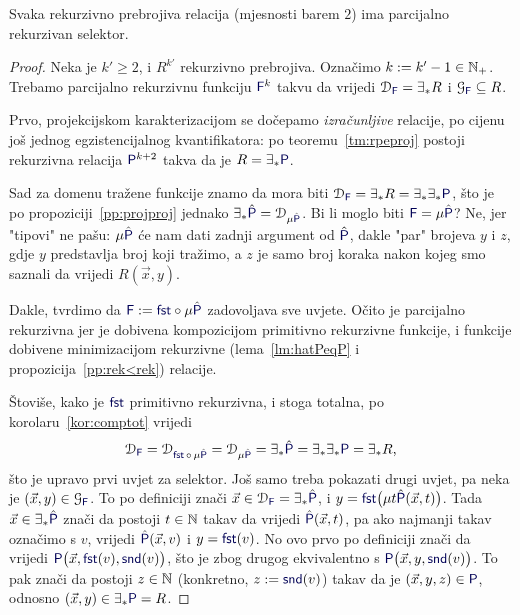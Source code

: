 \begin{lema}\label{lm:tmsel}
Svaka rekurzivno prebrojiva relacija (mjesnosti barem $2$) ima parcijalno rekurzivan selektor.
\end{lema}
\begin{proof}
Neka je $k'\ge2$, i $R^{k'}$ rekurzivno prebrojiva. Označimo $k:=k'-1\in{\mathbb N}_+$. Trebamo parcijalno rekurzivnu funkciju $\f F^k$ takvu da vrijedi $\dom{\f F}=\exists_*R$ i $\graf{\f F}\subseteq R$. 

Prvo, projekcijskom karakterizacijom se dočepamo \emph{izračunljive} relacije, po cijenu još jednog egzistencijalnog kvantifikatora: po teoremu~\ref{tm:rpeproj} postoji rekurzivna relacija $\f P^{k+2}$ takva da je $R=\exists_*\f P$.

Sad za domenu tražene funkcije znamo da mora biti $\dom{\f F}=\exists_*R=\exists_*\exists_*\f P$, što je po propoziciji~\ref{pp:projproj} jednako $\exists_*\hat{\f P}=\dom{\mu\hat{\f P}}$. Bi li moglo biti $\f F=\mu\hat{\f P}$? Ne, jer "tipovi" ne pašu: $\mu\hat{\f P}$ će nam dati zadnji argument od $\hat{\f P}$, dakle "par" brojeva $y$ i $z$, gdje $y$ predstavlja broj koji tražimo, a $z$ je samo broj koraka nakon kojeg smo saznali da vrijedi $R(\vec x,y)$.

Dakle, tvrdimo da $\f F:=\f{fst}\circ\mu\hat{\f P}$ zadovoljava sve uvjete. Očito je parcijalno rekurzivna jer je dobivena kompozicijom primitivno rekurzivne funkcije, i funkcije dobivene minimizacijom rekurzivne (lema~\ref{lm:hatPeqP} i propozicija~\ref{pp:rek<rek}) relacije.

    Štoviše, kako je $\f{fst}$ primitivno rekurzivna, i stoga totalna, po korolaru~\ref{kor:comptot} vrijedi
\begin{equation}
    \dom{\f F}=\dom{\f{fst}\,\circ\,\mu\hat{\f P}}=\dom{\mu\hat{\f P}}=\exists_*\hat{\f P}=\exists_*\exists_*\f P=\exists_*R\text,
\end{equation}
što je upravo prvi uvjet za selektor. Još samo treba pokazati drugi uvjet, pa neka je $(\vec x,y)\in\graf{\f F}$. To po definiciji znači $\vec x\in\dom{\f F}=\exists_*\hat{\f P}$, i
$y=\f{fst}\bigl(\mu t\hat{\f P}(\vec x,t)\bigr)$. Tada $\vec x\in\exists_*\hat{\f P}$ znači da postoji $t\in{\mathbb N}$ takav da vrijedi $\hat{\f P}(\vec x,t)$, 
pa ako najmanji takav označimo s $v$, vrijedi 
$\hat{\f P}(\vec x,v)$ i $y=\f{fst}(v)$. No ovo prvo po definiciji znači da vrijedi $\f P\bigl(\vec x,\f{fst}(v),\f{snd}(v)\bigr)$, što je zbog drugog ekvivalentno s $\f P\bigl(\vec x,y,\f{snd}(v)\bigr)$. To pak znači da postoji $z\in{\mathbb N}$ (konkretno, $z:=\f{snd}(v)$) takav da je $(\vec x,y,z)\in\f P$, odnosno $(\vec x,y)\in\exists_*\f P=R$.
\end{proof}

